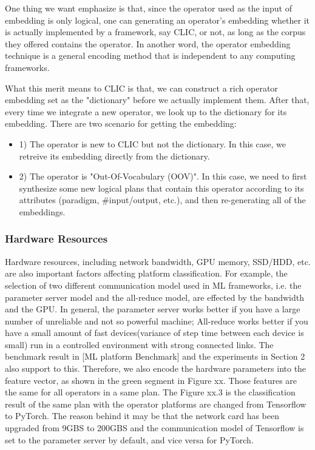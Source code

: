 One thing we want emphasize is that, 
since the operator used as the input of embedding is only logical,
one can generating an operator's embedding whether it is actually implemented by a framework, say CLIC, or not, 
as long as the corpus they offered contains the operator.
In another word, the operator embedding technique is a general encoding method that is independent to any computing frameworks.

What this merit means to CLIC is that, we can construct a rich operator embedding set as the "dictionary" before we actually implement them.
After that, every time we integrate a new operator, we look up to the dictionary for its embedding. There are two scenario for getting the embedding:
\begin{itemize}
    \item 1) The operator is new to CLIC but not the dictionary. In this case, we retreive its embedding directly from the dictionary.
    \item 2) The operator is "Out-Of-Vocabulary (OOV)". In this case, we need to first synthesize some new logical plans that contain this operator according to its attributes (paradigm, \#input/output, etc.), and then re-generating all of the embeddings.
\end{itemize}


\subsubsection{Hardware Resources}
Hardware resources, including network bandwidth, GPU memory, SSD/HDD, etc. are also important factors affecting platform classification. 
For example, the selection of two different communication model used in ML frameworks, i.e. the parameter server model and the all-reduce model, are effected by the bandwidth and the GPU. 
In general, the parameter server works better if you have a large number of unreliable and not so powerful machine;
All-reduce works better if you have a small amount of fast devices(variance of step time between each device is small) run in a controlled environment with strong connected links. 
The benchmark result in [ML platform Benchmark] and the experiments in Section 2 also support to this. 
Therefore, we also encode the hardware parameters into the feature vector, as shown in the green segment in Figure xx. 
Those features are the same for all operators in a same plan. 
The Figure xx.3 is the classification result of the same plan with the operator platforms are changed from Tensorflow to PyTorch. 
The reason behind it may be that the network card has been upgraded from 9GBS to 200GBS and the communication model of Tensorflow is set to the parameter server by default, and vice versa for PyTorch. 


